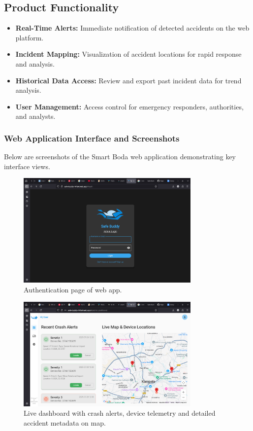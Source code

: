\documentclass[12pt]{article}
\begin{document}
\subsection{Product Functionality}
\begin{itemize}
  \item \textbf{Real-Time Alerts:} Immediate notification of detected accidents on the web platform.
  \item \textbf{Incident Mapping:} Visualization of accident locations for rapid response and analysis.
  \item \textbf{Historical Data Access:} Review and export past incident data for trend analysis.
  \item \textbf{User Management:} Access control for emergency responders, authorities, and analysts.
\end{itemize}

\subsubsection{Web Application Interface and Screenshots}

Below are screenshots of the Smart Boda web application demonstrating key interface views.

\begin{figure}[H]
  \centering
  \includegraphics[width=0.8\textwidth]{Login.png}
  \caption{Authentication page of web app.}
  \label{fig:login}
\end{figure}

\begin{figure}[H]
  \centering
  \includegraphics[width=0.8\textwidth]{Dashboard.png}
  \caption{Live dashboard with crash alerts, device telemetry and detailed accident metadata on map.}
  \label{fig:dashboard}
\end{figure}
\end{document}
